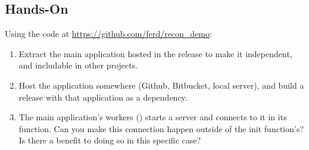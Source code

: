 \subsection*{Hands-On}

Using the code at \href{https://github.com/ferd/recon\_demo}{https://github.com/ferd/recon\_demo}:

\begin{enumerate}
	\item Extract the main application hosted in the release to make it independent, and includable in other projects.
	\item Host the application somewhere (Github, Bitbucket, local server), and build a release with that application as a dependency.
	\item The main application's workers () starts a server and connects to it in its  function. Can you make this connection happen outside of the init function's? Is there a benefit to doing so in this specific case?
\end{enumerate}

